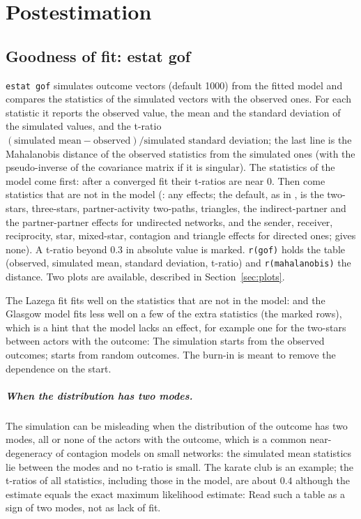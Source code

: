 \chapter{Postestimation}\label{ch:postest}

\section{Goodness of fit: estat gof}\label{sec:gof}

\texttt{estat gof} simulates  outcome vectors (default 1000) from the fitted model and compares the statistics of the simulated vectors with the observed ones. For each statistic it reports the observed value, the mean and the standard deviation of the simulated values, and the t-ratio $(\text{simulated mean}-\text{observed})/\text{simulated standard deviation}$; the last line is the Mahalanobis distance of the observed statistics from the simulated ones (with the pseudo-inverse of the covariance matrix if it is singular). The statistics of the model come first: after a converged fit their t-ratios are near 0. Then come statistics that are not in the model (: any effects; the default, as in \alaamee{}, is the two-stars, three-stars, partner-activity two-paths, triangles, the indirect-partner and the partner-partner effects for undirected networks, and the sender, receiver, reciprocity, star, mixed-star, contagion and triangle effects for directed ones;  gives none). A t-ratio beyond 0.3 in absolute value is marked. \texttt{r(gof)} holds the table (observed, simulated mean, standard deviation, t-ratio) and \texttt{r(mahalanobis)} the distance. Two plots are available, described in Section~\ref{sec:plots}.

The Lazega fit fits well on the statistics that are not in the model:
and the Glasgow model fits less well on a few of the extra statistics (the marked rows), which is a hint that the model lacks an effect, for example one for the two-stars between actors with the outcome:
The simulation starts from the observed outcomes; \alaamee{} starts from random outcomes. The burn-in is meant to remove the dependence on the start.

\paragraph{When the distribution has two modes.} The simulation can be misleading when the distribution of the outcome has two modes, all or none of the actors with the outcome, which is a common near-degeneracy of contagion models on small networks: the simulated mean statistics lie between the modes and no t-ratio is small. The karate club is an example; the t-ratios of all statistics, including those in the model, are about $0.4$ although the estimate equals the exact maximum likelihood estimate:
Read such a table as a sign of two modes, not as lack of fit.

